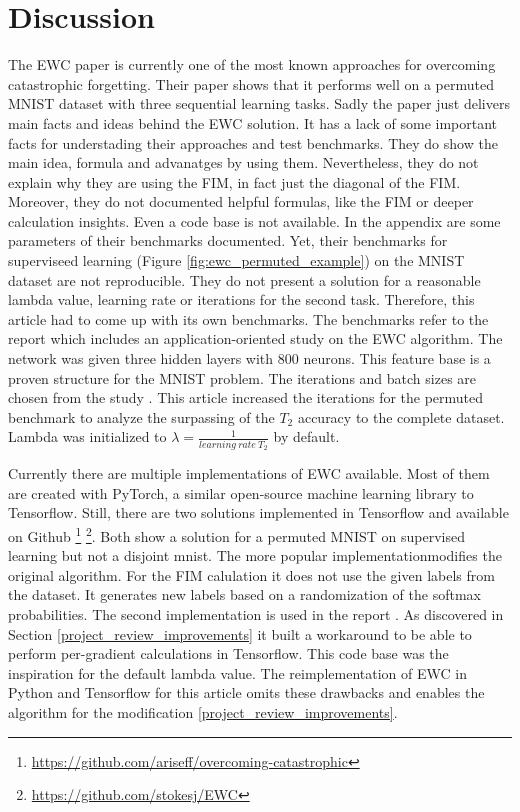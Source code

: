 \chapter{Discussion}

The EWC paper is currently one of the most known approaches for overcoming catastrophic forgetting.
Their paper shows that it performs well on a permuted MNIST dataset with three sequential learning tasks.
\newline
Sadly the paper just delivers main facts and ideas behind the EWC solution.
It has a lack of some important facts for understading their approaches and test benchmarks.
They do show the main idea, formula and advanatges by using them.
Nevertheless, they do not explain why they are using the FIM, in fact just the diagonal of the FIM.
Moreover, they do not documented helpful formulas, like the FIM or deeper calculation insights.
Even a code base is not available.
In the appendix are some parameters of their benchmarks documented.
Yet, their benchmarks for superviseed learning (Figure \ref{fig:ewc_permuted_example}) on the MNIST dataset are not reproducible.
They do not present a solution for a reasonable lambda value, learning rate or iterations for the second task.
Therefore, this article had to come up with its own benchmarks.
The benchmarks refer to the report \cite{cf_application_oriented_study} which includes an application-oriented study on the EWC algorithm.
The network was given three hidden layers with 800 neurons.
This feature base is a proven structure for the MNIST problem.
The iterations and batch sizes are chosen from the study \cite{cf_application_oriented_study}.
This article increased the iterations for the permuted benchmark to analyze the surpassing of the $T_2$ accuracy to the complete dataset.
Lambda was initialized to $\lambda = \frac{1}{learning \: rate \: T_2}$ by default.

Currently there are multiple implementations of EWC available.
Most of them are created with PyTorch, a similar open-source machine learning library to Tensorflow.
Still, there are two solutions implemented in Tensorflow and available on Github
\footnote[1]{\url{https://github.com/ariseff/overcoming-catastrophic}}
\footnote[2]{\url{https://github.com/stokesj/EWC}}.
Both show a solution for a permuted MNIST on supervised learning but not a disjoint mnist.
The more popular implementation\footnotemark[1] modifies the original algorithm.
For the FIM calulation it does not use the given labels from the dataset.
It generates new labels based on a randomization of the softmax probabilities.
The second implementation \footnotemark[2] is used in the report \cite{cf_application_oriented_study}.
As discovered in Section \ref{project_review_improvements} it built a workaround to be able to perform per-gradient calculations in Tensorflow.
This code base was the inspiration for the default lambda value.
\newline
The reimplementation of EWC in Python and Tensorflow for this article omits these drawbacks and enables the algorithm for the modification \ref{project_review_improvements}.

